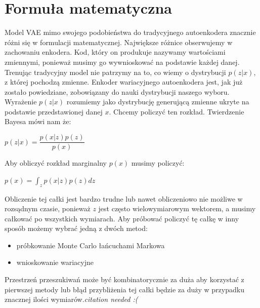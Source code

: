 \documentclass[a4paper,12pt]{book} %
\begin{document}
\section{Formuła matematyczna}
Model VAE mimo swojego podobieństwa do tradycyjnego autoenkodera znacznie różni się w formulacji matematycznej. Największe różnice obserwujemy w zachowaniu enkodera. Kod, który on produkuje nazywamy wartościami zmiennymi, ponieważ musimy go wywnioskować na podstawie każdej danej. Trenując tradycyjny model nie patrzymy na to, co wiemy o dystrybucji $p(z|x)$, z której pochodzą zmienne. Enkoder wariacyjnego autoenkodera jest, jak już zostało powiedziane, zobowiązany do nauki dystrybucji naszego wyboru. Wyrażenie $p(z|x)$ rozumiemy jako dystrybucję generującą zmienne ukryte na podstawie przedstawionej danej $x$. Chcemy policzyć ten rozkład. Twierdzenie Bayesa mówi nam że:
\begin{center}
	$p(z|x)=\dfrac{p(x|z)p(z)}{p(x)}$
\end{center}
Aby obliczyć rozkład marginalny $p(x)$ musimy policzyć:
\begin{center}
	$p(x) = \displaystyle\int_{z}^{}p(x|z)p(z)dz$
\end{center}
Obliczenie tej całki jest bardzo trudne lub nawet obliczeniowo nie możliwe w rozsądnym czasie, ponieważ $z$ jest często wielowymiarowym wektorem, a musimy całkować po wszystkich wymiarach. Aby próbować policzyć tę całkę w inny sposób możemy wybrać jedną z dwóch metod:
\begin{itemize}
	\item próbkowanie Monte Carlo łańcuchami Markowa
	\item wnioskowanie wariacyjne
\end{itemize}
Przestrzeń przeszukiwań może być kombinatorycznie za duża aby korzystać z pierwszej metody lub błąd przybliżenia tej całki będzie za duży w przypadku znacznej ilości wymiarów.\textit{citation needed :(} \\
\end{document}
